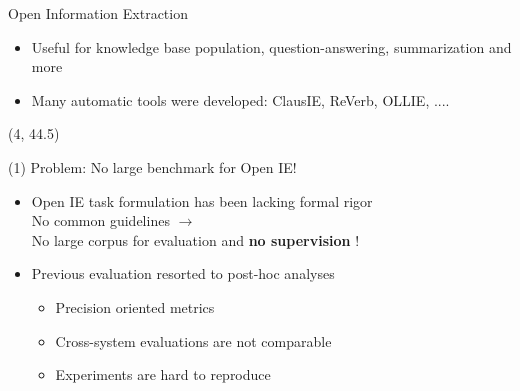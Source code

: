 \documentclass[final]{beamer}
\newcommand{\commonvspace}[0]{\vspace{1cm}}
\begin{document}
\begin{frame}{}
\begin{textblock}{82}
\begin{block}{Open Information Extraction}
\begin{itemize}
\item Useful for knowledge base population, question-answering, summarization and more
\item Many automatic tools were developed: ClausIE, ReVerb, OLLIE, ....

  \end{itemize}

\end{block}
\end{textblock}

\begin{textblock}{39}(4, 44.5)
  \begin{block}{(1) Problem: No large benchmark for Open IE!}
    
  \begin{itemize}
        \setlength\itemsep{1em}
  \item Open IE task formulation has been lacking formal rigor
    \\
    No common guidelines $\rightarrow$
    \\
    No large corpus for evaluation and \textbf{no supervision} !
  \item Previous evaluation resorted to post-hoc analyses
    \begin{itemize}
          \setlength\itemsep{1em}
    \item \alert{Precision oriented} metrics
    \item Cross-system evaluations are \alert{not comparable}
    \item Experiments are \alert{hard to reproduce}
    \end{itemize}
  \end{itemize}
  \end{block}

  \commonvspace
  \vspace{1.17cm}


\end{textblock}
\end{frame}
\end{document}
